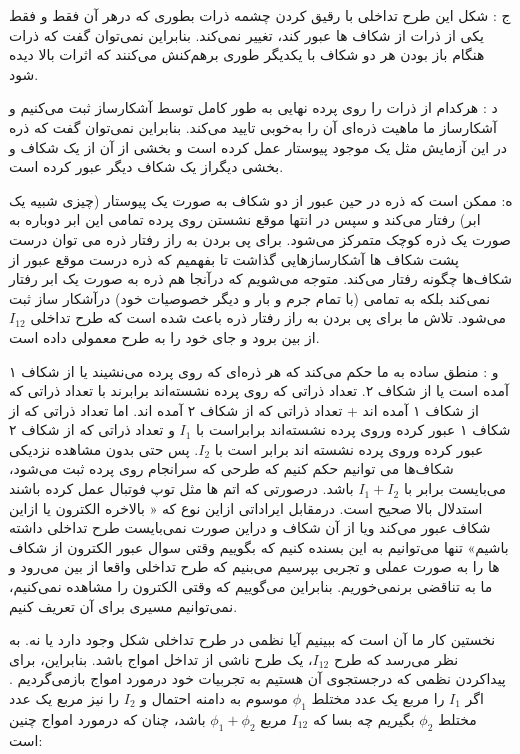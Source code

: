ج : شکل این طرح تداخلی با رقیق کردن چشمه ذرات بطوری که درهر آن فقط و فقط یکی از ذرات از شکاف ها عبور کند، تغییر نمی‌کند. بنابراین نمی‌توان گفت که ذرات هنگام باز بودن هر دو شکاف با یکدیگر طوری برهم‌کنش می‌کنند که اثرات بالا
دیده شود.

د : هرکدام از ذرات را روی پرده نهایی به طور کامل توسط آشکارساز ثبت می‌کنیم و آشکارساز ما ماهیت ذره‌ای آن را
به‌خوبی تایید می‌کند. بنابراین نمی‌توان گفت که ذره در این آزمایش مثل یک موجود پیوستار عمل کرده است و بخشی از آن از
یک شکاف و بخشی دیگراز یک شکاف دیگر عبور کرده است.

  
ه: ممکن است که ذره در حین عبور از دو شکاف به صورت یک پیوستار (چیزی شبیه
یک ابر) رفتار می‌کند و سپس در انتها موقع نشستن روی پرده تمامی این ابر دوباره به صورت یک ذره کوچک متمرکز می‌شود.
برای پی بردن به راز رفتار ذره می توان درست پشت شکاف ها آشکارسازهایی گذاشت تا بفهمیم که ذره درست موقع عبور از
شکاف‌ها چگونه رفتار می‌کند. متوجه می‌شویم که درآنجا هم ذره به صورت یک ابر رفتار نمی‌کند بلکه به تمامی (با تمام جرم و بار و دیگر خصوصیات خود) درآشکار ساز ثبت می‌شود. تلاش ما برای پی بردن به راز رفتار ذره باعث شده است که طرح تداخلی $I_{12}$
 از بین برود و جای خود را به طرح معمولی داده است. 
 
و :  منطق ساده به ما حکم می‌کند که هر ذره‌ای که
روی پرده می‌نشیند یا از شکاف ۱ آمده است یا از شکاف ۲. تعداد ذراتی که روی پرده نشسته‌اند برابرند با تعداد ذراتی که از
شکاف ۱ آمده اند + تعداد ذراتی که از شکاف ۲ آمده اند. اما تعداد ذراتی که از شکاف ۱ عبور کرده وروی پرده نشسته‌اند
برابراست با $I_{1}$ و تعداد ذراتی که از شکاف ۲ عبور کرده وروی پرده نشسته اند برابر است با $I_{2}$. پس حتی بدون مشاهده نزدیکی
شکاف‌ها می توانیم حکم کنیم که طرحی که سرانجام روی پرده ثبت می‌شود، می‌بایست برابر با $I_{1} + I_{2}$ باشد. درصورتی که اتم
ها مثل توپ فوتبال عمل کرده باشند استدلال بالا صحیح است. 
درمقابل ایراداتی ازاین نوع که « بالاخره الکترون یا ازاین شکاف عبور می‌کند ویا از آن شکاف و دراین صورت نمی‌بایست طرح تداخلی داشته باشیم» تنها می‌توانیم به این بسنده کنیم که بگوییم وقتی
سوال عبور الکترون از شکاف ها را به صورت عملی و تجربی بپرسیم می‌بنیم که طرح تداخلی واقعا از بین می‌رود
و ما به تناقضی برنمی‌خوریم. بنابراین می‌گوییم که وقتی الکترون را مشاهده نمی‌کنیم، نمی‌توانیم مسیری برای آن تعریف کنیم. 
 
 نخستین کار ما آن است که ببینیم آیا نظمی در طرح تداخلی شکل وجود دارد یا نه. به نظر می‌رسد که طرح $I_{12}$، یک طرح ناشی از تداخل امواج باشد. 
 بنابراین، برای پیداکردن نظمی که درجستجوی آن هستیم به تجربیات خود درمورد
امواج بازمی‌گردیم . اگر $I_{1}$ را مربع یک عدد مختلط $\phi_{1}$ موسوم به دامنه احتمال و $I_{2}$ را نیز مربع یک عدد مختلط $\phi_{2}$ بگیریم
چه بسا که $I_{12}$ مربع $\phi_{1} + \phi_{2}$ باشد، چنان که درمورد امواج چنین است:

